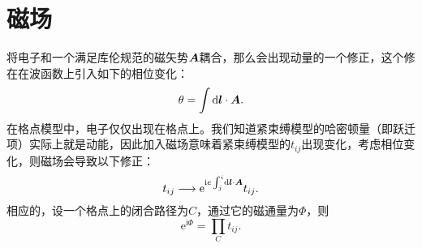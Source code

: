 \documentclass[hyperref, UTF8, a4paper]{ctexart}
\newcommand*{\ii}{\mathrm{i}}
\newcommand*{\ee}{\mathrm{e}}
\begin{document}
\section{磁场}

将电子和一个满足库伦规范的磁矢势$\vb*{A}$耦合，那么会出现动量的一个修正，这个修在在波函数上引入如下的相位变化：
\begin{equation}
    \theta = \int \dd{\vb*{l}} \cdot \vb*{A}.
\end{equation}
在格点模型中，电子仅仅出现在格点上。我们知道紧束缚模型的哈密顿量（即跃迁项）实际上就是动能，因此加入磁场意味着紧束缚模型的$t_{ij}$出现变化，考虑相位变化，则磁场会导致以下修正：
\begin{equation}
    t_{ij} \longrightarrow \ee^{\ii e \int_j^i \dd{\vb*{l}} \cdot \vb*{A} } t_{ij}.
\end{equation}
相应的，设一个格点上的闭合路径为$C$，通过它的磁通量为$\Phi$，则
\begin{equation}
    \ee^{\ii \Phi} = \prod_{C} t_{ij}.
\end{equation}
\end{document}
